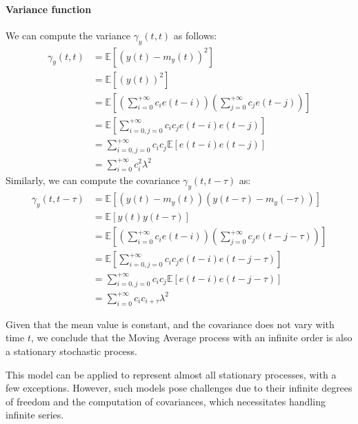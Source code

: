 \paragraph*{Variance function}
We can compute the variance $\gamma_y(t,t)$ as follows:
\begin{align*}
    \gamma_y(t,t)   &=\mathbb{E}\left[{\left(y(t)-m_y(t)\right)}^2\right] \\
                    &=\mathbb{E}\left[{\left(y(t)\right)}^2\right] \\
                    &=\mathbb{E}\left[\left(\sum_{i=0}^{+\infty}c_i e(t-i)\right)\left(\sum_{j=0}^{+\infty}c_j e(t-j)\right)\right] \\
                    &=\mathbb{E}\left[\sum_{i=0,j=0}^{+\infty}c_i c_j e(t-i)e(t-j)\right] \\
                    &=\sum_{i=0,j=0}^{+\infty}c_i c_j\mathbb{E}\left[e(t-i)e(t-j)\right] \\  
                    &=\sum_{i=0}^{+\infty}c_i^2\lambda^2
\end{align*}
Similarly, we can compute the covariance $\gamma_y(t,t-\tau)$ as:
\begin{align*}
    \gamma_y(t,t-\tau)  &=\mathbb{E}\left[\left(y(t)-m_y(t)\right)\left(y(t-\tau)-m_y(-\tau)\right)\right] \\
                        &=\mathbb{E}\left[y(t)y(t-\tau)\right] \\
                        &=\mathbb{E}\left[\left(\sum_{i=0}^{+\infty}c_i e(t-i)\right)\left(\sum_{j=0}^{+\infty}c_j e(t-j-\tau)\right)\right] \\
                        &=\mathbb{E}\left[\sum_{i=0,j=0}^{+\infty}c_i c_j e(t-i)e(t-j-\tau)\right] \\
                        &=\sum_{i=0,j=0}^{+\infty}c_i c_j\mathbb{E}\left[e(t-i)e(t-j-\tau)\right] \\  
                        &=\sum_{i=0}^{+\infty}c_i c_{i+\tau}\lambda^2
\end{align*}

Given that the mean value is constant, and the covariance does not vary with time $t$, we conclude that the Moving Average process with an infinite order is also a stationary stochastic process.

This model can be applied to represent almost all stationary processes, with a few exceptions.
However, such models pose challenges due to their infinite degrees of freedom and the computation of covariances, which necessitates handling infinite series.